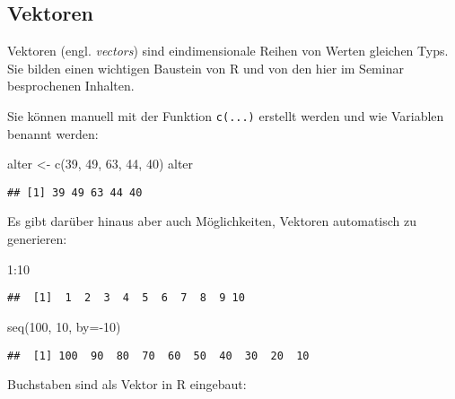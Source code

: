 \documentclass[11pt,german,a4paper]{article}
\newenvironment{Shaded}{\begin{snugshade}}{\end{snugshade}}
\newcommand{\AttributeTok}[1]{\textcolor[rgb]{0.77,0.63,0.00}{#1}}
\newcommand{\DecValTok}[1]{\textcolor[rgb]{0.00,0.00,0.81}{#1}}
\newcommand{\FunctionTok}[1]{\textcolor[rgb]{0.00,0.00,0.00}{#1}}
\newcommand{\NormalTok}[1]{#1}
\newcommand{\OtherTok}[1]{\textcolor[rgb]{0.56,0.35,0.01}{#1}}
\newcommand{\SpecialCharTok}[1]{\textcolor[rgb]{0.00,0.00,0.00}{#1}}
\begin{document}
\hypertarget{vektoren}{%
\subsection{Vektoren}\label{vektoren}}

Vektoren (engl. \emph{vectors}) sind eindimensionale Reihen von Werten gleichen Typs. Sie bilden einen wichtigen Baustein von R und von den hier im Seminar besprochenen Inhalten.

Sie können manuell mit der Funktion \texttt{c(...)} erstellt werden und wie Variablen benannt werden:

\begin{Shaded}
\begin{Highlighting}[]
\NormalTok{alter }\OtherTok{\textless{}{-}} \FunctionTok{c}\NormalTok{(}\DecValTok{39}\NormalTok{, }\DecValTok{49}\NormalTok{, }\DecValTok{63}\NormalTok{, }\DecValTok{44}\NormalTok{, }\DecValTok{40}\NormalTok{)}
\NormalTok{alter}
\end{Highlighting}
\end{Shaded}

\begin{verbatim}
## [1] 39 49 63 44 40
\end{verbatim}

Es gibt darüber hinaus aber auch Möglichkeiten, Vektoren automatisch zu generieren:

\begin{Shaded}
\begin{Highlighting}[]
\DecValTok{1}\SpecialCharTok{:}\DecValTok{10}
\end{Highlighting}
\end{Shaded}

\begin{verbatim}
##  [1]  1  2  3  4  5  6  7  8  9 10
\end{verbatim}

\begin{Shaded}
\begin{Highlighting}[]
\FunctionTok{seq}\NormalTok{(}\DecValTok{100}\NormalTok{, }\DecValTok{10}\NormalTok{, }\AttributeTok{by=}\SpecialCharTok{{-}}\DecValTok{10}\NormalTok{)}
\end{Highlighting}
\end{Shaded}

\begin{verbatim}
##  [1] 100  90  80  70  60  50  40  30  20  10
\end{verbatim}

Buchstaben sind als Vektor in R eingebaut:
\end{document}
